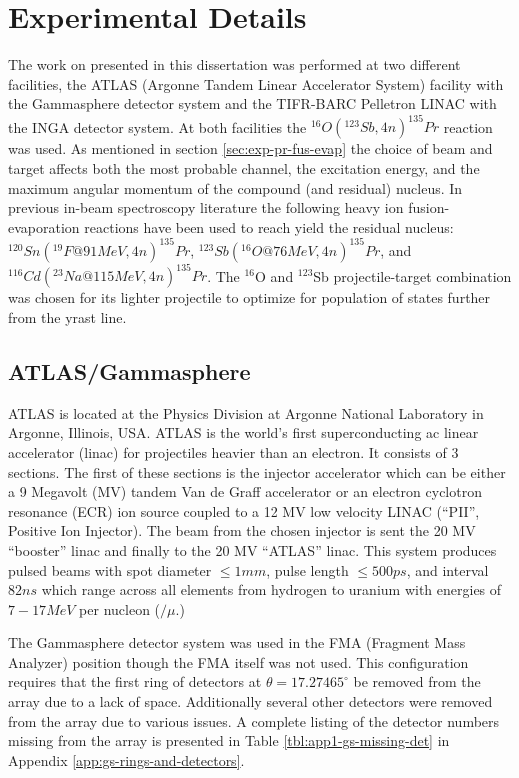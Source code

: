\section{Experimental Details}
\label{sec:exp-pr-details}
The work on \pr{} presented in this dissertation was performed at two different facilities, the ATLAS (Argonne Tandem Linear Accelerator System) facility with the Gammasphere detector system and the TIFR-BARC Pelletron LINAC with the INGA detector system. At both facilities the $^{16}O(^{123}Sb,4n)^{135}Pr$ reaction was used. As mentioned in section \ref{sec:exp-pr-fus-evap} the choice of beam and target affects both the most probable channel, the excitation energy, and the maximum angular momentum of the compound (and residual) nucleus. In previous in-beam \gr{} spectroscopy literature the following heavy ion fusion-evaporation reactions have been used to reach yield the \pr{} residual nucleus: $^{120}Sn(^{19}F @ 91MeV,4n)^{135}Pr$\cite{Semkow135Pr}, $^{123}Sb(^{16}O @ 76MeV,4n)^{135}Pr$\cite{135PrLifetimes}, and  $^{116}Cd(^{23}Na @ 115MeV,4n)^{135}Pr$\cite{EPaul135Pr}. The $^{16}$O and $^{123}$Sb projectile-target combination was chosen for its lighter projectile to optimize for population of states further from the yrast line.

\subsection{ATLAS/Gammasphere}
\label{ssec:exp-pr-details-gs}
ATLAS is located at the Physics Division at Argonne National Laboratory in Argonne, Illinois, USA. ATLAS is the world's first superconducting ac linear accelerator (linac) for projectiles heavier than an electron. It consists of 3 sections. The first of these sections is the injector accelerator which can be either a 9 Megavolt (MV) tandem Van de Graff accelerator or an electron cyclotron resonance (ECR) ion source coupled to a 12 MV low velocity LINAC (``PII'', Positive Ion Injector). The beam from the chosen injector is sent the 20 MV ``booster'' linac and finally to the 20 MV ``ATLAS'' linac. This system produces pulsed beams with spot diameter $\leq1mm$, pulse length $\leq500ps$, and interval $82ns$ which range across all elements from hydrogen to uranium with energies of $7-17MeV$ per nucleon ($/\mu{}$.)

The Gammasphere detector system was used in the FMA (Fragment Mass Analyzer) position though the FMA itself was not used. This configuration requires that the first ring of detectors at $\theta{}=17.27465^{\circ}$ be removed from the array due to a lack of space. Additionally several other detectors were removed from the array due to various issues. A complete listing of the detector numbers missing from the array is presented in Table \ref{tbl:app1-gs-missing-det} in Appendix \ref{app:gs-rings-and-detectors}.

